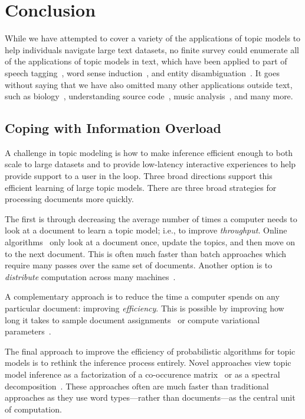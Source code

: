
\chapter{Conclusion}
\label{ch:conc}

While we have attempted to cover a variety of the applications of
topic models to help individuals navigate large text datasets, no
finite survey could enumerate all of the applications of topic models
in text, which have been applied to part of speech
tagging~\citep{toutanova-08}, word sense induction~\citep{brody-09},
and entity disambiguation~\citep{kataria-11}.  It goes without saying
that we have also omitted many other applications outside text, such
as biology~\citep{pritchard-00}, understanding source
code~\citep{maskeri-08}, music analysis~\citep{hu-09}, and many more.

\section{Coping with Information Overload}
\label{sec:fast-inference}

A challenge in topic modeling is how to make inference efficient
enough to both scale to large datasets and to provide low-latency
interactive experiences to help provide support to a user in the loop.
Three broad directions support this efficient learning of large topic
models.  There are three broad strategies for processing documents
more quickly.


The first is through decreasing the average number of times a computer
needs to look at a document to learn a topic model; i.e., to improve
\emph{throughput}.  Online algorithms~\citep{hoffman-10} only look at a
document once, update the topics, and then move on to the next
document.  This is often much faster than batch approaches which
require many passes over the same set of documents.  Another option is
to \emph{distribute} computation across many machines~\citep{zhai-12}.

A complementary approach is to reduce the time a computer spends on
any particular document: improving \emph{efficiency}.  This is
possible by improving how long it takes to sample document
assignments~\citep{yao-09,li2014reducing} or compute variational
parameters~\citep{mimno-12}.

The final approach to improve the efficiency of probabilistic
algorithms for topic models is to rethink the inference process
entirely.  Novel approaches view topic model inference as a
factorization of a co-occurence matrix~\citep{arora-13} or as a spectral
decomposition~\citep{anandkumar-12}.  These approaches often are much faster than
traditional approaches as they use word types---rather than
documents---as the central unit of computation.

